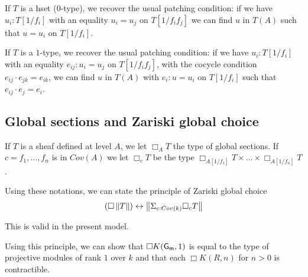 If $T$ is a hset ($0$-type), we recover the usual patching condition: if we have $u_i:T[1/f_i]$ with an equality $u_i = u_j$ on
$T[1/f_if_j]$ we can find $u$ in $T(A)$ such that $u = u_i$ on $T[1/f_i]$.

If $T$ is a $1$-type, we recover the usual patching condition: if we have $u_i:T[1/f_i]$ with an equality $e_{ij}:u_i = u_j$ on
$T[1/f_if_j]$, with the cocycle condition $e_{ij}\cdot e_{jk} = e_{ik}$,
we can find $u$ in $T(A)$ with $e_i:u = u_i$ on $T[1/f_i]$ such that $e_{ij}\cdot e_j = e_i$.





\subsection{Global sections and Zariski global choice}

If $T$ is a sheaf defined at level $A$, we let $\Box_A T$ the type of global sections.
If $c = f_1,\dots,f_n$ is in $Cov(A)$ we let $\Box_c T$ be the type $\Box_{A[1/f_1]}T\times\dots\times\Box_{A[1/f_n]}T$.

Using these notations, we can state the principle of Zariski global choice
$$
(\Box \left\lVert T \right\rVert)\leftrightarrow \left\lVert \Sigma_{c:Cov(k)}\Box_c T \right\rVert
$$

This is valid in the present model.

Using this principle, we can show that $\Box K(\mathsf{G_m},1)$ is equal to the type of projective modules of rank $1$ over $k$
and that each $\Box K(R,n)$ for $n>0$ is contractible.
                                                                                  




 
